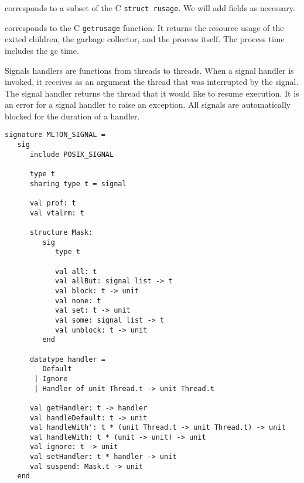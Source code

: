 \begin{description}
corresponds to a subset of the C {\tt struct rusage}.  We will add fields as
necessary.

corresponds to the C {\tt getrusage} function.  It returns the resource usage of
the exited children, the garbage collector, and the process itself.  The process
time includes the gc time.
\end{description}

Signals handlers are functions from threads to threads.  When a signal 
handler is invoked, it receives as an argument the thread that was
interrupted by the signal.  The signal handler returns the thread that 
it would like to resume execution.  It is an error for a signal
handler to raise an exception.  All signals are automatically blocked
for the duration of a handler.

\begin{verbatim}
signature MLTON_SIGNAL =
   sig
      include POSIX_SIGNAL

      type t
      sharing type t = signal

      val prof: t
      val vtalrm: t

      structure Mask:
         sig
            type t
               
            val all: t
            val allBut: signal list -> t
            val block: t -> unit
            val none: t
            val set: t -> unit
            val some: signal list -> t
            val unblock: t -> unit
         end

      datatype handler =
         Default
       | Ignore
       | Handler of unit Thread.t -> unit Thread.t

      val getHandler: t -> handler
      val handleDefault: t -> unit
      val handleWith': t * (unit Thread.t -> unit Thread.t) -> unit
      val handleWith: t * (unit -> unit) -> unit
      val ignore: t -> unit
      val setHandler: t * handler -> unit
      val suspend: Mask.t -> unit
   end
\end{verbatim}

